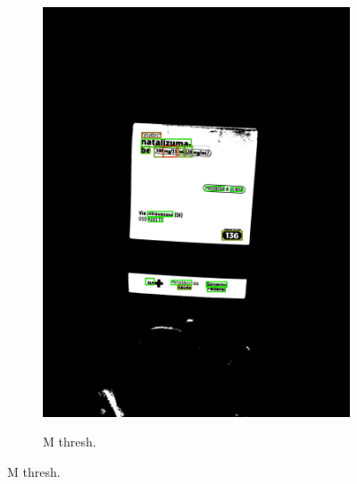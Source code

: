 \begin{figure}[htb]
\begin{subfigure}[t]{0.21\textwidth}
        \includegraphics[width=\linewidth]{../pictures/tysabri_cmyk_c_only_thresh_boxes.jpg}
    \end{subfigure}
    \hfill
    \begin{subfigure}[t]{0.21\textwidth}
        \centering
        \caption{M thresh.}
        \label{fig:foto:versoes:2:M_thresh:boxes}

\end{subfigure}
\end{figure}
